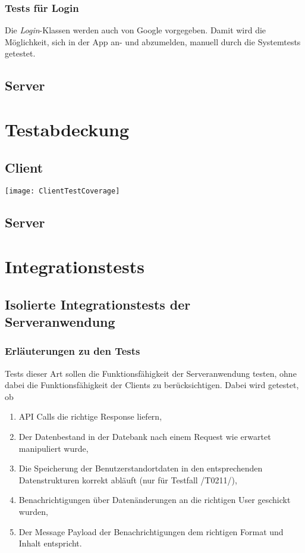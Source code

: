\documentclass[11pt,a4paper]{scrartcl}
\begin{document}
\subsubsection{Tests für Login}
Die \textit{Login}-Klassen werden auch von Google vorgegeben. Damit wird die Möglichkeit, sich in der App an- und abzumelden, manuell durch die Systemtests getestet.


\newpage

\subsection{Server}

\newpage

\section{Testabdeckung}

\subsection{Client}

\begin{center}
	\texttt{[image: ClientTestCoverage]}
\end{center}

\subsection{Server}

\newpage

\section{Integrationstests}
\subsection{Isolierte Integrationstests der Serveranwendung}\label{ServerIT}
\subsubsection{Erläuterungen zu den Tests}
Tests dieser Art sollen die Funktionsfähigkeit der Serveranwendung testen, ohne dabei die Funktionsfähigkeit der Clients zu berücksichtigen. Dabei wird getestet, ob
\begin{enumerate}
	\item API Calls die richtige Response liefern,
	\item Der Datenbestand in der Datebank nach einem Request wie erwartet manipuliert wurde,
	\item Die Speicherung der Benutzerstandortdaten in den entsprechenden Datenstrukturen korrekt abläuft (nur für Testfall /T0211/),
	\item Benachrichtigungen über Datenänderungen an die richtigen User geschickt wurden,
	\item Der Message Payload der Benachrichtigungen dem richtigen Format und Inhalt entspricht.
\end{enumerate}
\end{document}

